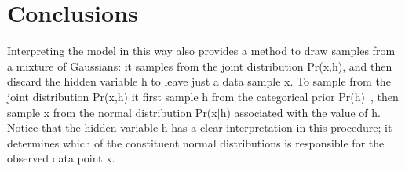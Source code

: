 \documentclass[10pt,twocolumn,letterpaper]{article}
\begin{document}
\section{Conclusions}
Interpreting the model in this way also provides a method to draw samples from a mixture of Gaussians: it samples from the joint distribution Pr(x,h), and then discard the hidden variable h to leave just a data sample x. To sample from the joint distribution Pr(x,h) it first sample h from the categorical prior Pr(h)~\cite{Piatti2009Limits}, then sample x from the normal distribution Pr(x$|$h) associated with the value of h. Notice that the hidden variable h has a clear interpretation in this procedure; it determines which of the constituent normal distributions is responsible for the observed data point x.


{\small


}
\end{document}
